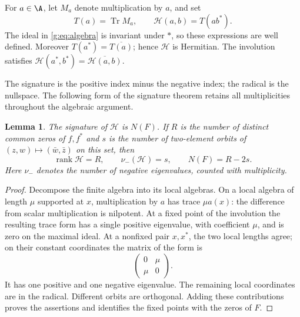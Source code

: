 \documentclass[UTF8,11pt]{ctexart}
\newtheorem{lem}[thm]{Lemma}
\theoremstyle{definition}
\numberwithin{equation}{section}
\newcommand{\HH}{\mathcal H}\newcommand{\Ecal}{\mathcal E}
\DeclareMathOperator{\rank}{rank}\DeclareMathOperator{\tr}{tr}\DeclareMathOperator{\Tr}{Tr}
\begin{document}
For $a\in\A$, let $M_a$ denote multiplication by $a$, and set
\begin{equation}\label{g:eq:form}
 T(a)=\Tr M_a,\qquad \HH(a,b)=T(ab^*).
\end{equation}
The ideal in \eqref{g:eq:algebra} is invariant under $*$, so these expressions
are well defined. Moreover $T(a^*)=\overline{T(a)}$; hence $\HH$ is Hermitian.
The involution satisfies
$\HH(a^*,b^*)=\overline{\HH(a,b)}$.

The signature is the positive index minus the negative index; the radical
is the nullspace. The following form of the signature theorem retains
all multiplicities throughout the algebraic argument.
\begin{lem}\label{g:lem:signature}
The signature of $\HH$ is $N(F)$. If $R$ is the number of distinct common
zeros of $f,f^*$ and $s$ is the number of two-element orbits of
$(z,w)\mapsto(\bar w,\bar z)$ on this set, then
\[
 \rank\HH=R,\qquad \nu_-(\HH)=s,\qquad
 N(F)=R-2s.
\]
Here $\nu_-$ denotes the number of negative eigenvalues, counted with
multiplicity.
\end{lem}
\begin{proof}
Decompose the finite algebra into its local algebras. On a local algebra
of length $\mu$ supported at $x$, multiplication by $a$ has trace
$\mu a(x)$: the difference from scalar multiplication is nilpotent.
At a fixed point of the involution the resulting trace form has a single
positive eigenvalue, with coefficient $\mu$, and is zero on the maximal
ideal. At a nonfixed pair $x,x^*$, the two local lengths agree; on their
constant coordinates the matrix of the form is
\[
 \begin{pmatrix}0&\mu\\ \mu&0\end{pmatrix}.
\]
It has one positive and one negative eigenvalue. The remaining local
coordinates are in the radical. Different orbits are orthogonal. Adding
these contributions proves the assertions and identifies the fixed
points with the zeros of $F$.
\end{proof}
\end{document}
